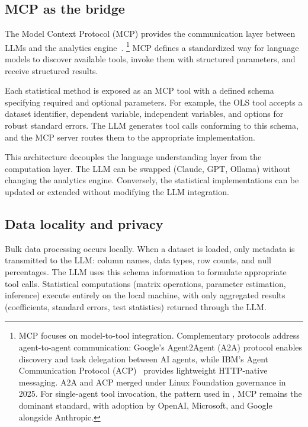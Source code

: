 \subsection{MCP as the bridge}

The Model Context Protocol (MCP) provides the communication layer between
LLMs and the analytics engine~\citep{MCP:2024}.%
\footnote{MCP focuses on model-to-tool integration. Complementary protocols
address agent-to-agent communication: Google's Agent2Agent (A2A) protocol
\citep{A2A:2025} enables discovery and task delegation between AI agents,
while IBM's Agent Communication Protocol (ACP)~\citep{ACP:2025} provides
lightweight HTTP-native messaging. A2A and ACP merged under Linux Foundation
governance in 2025. For single-agent tool invocation, the pattern used in
, MCP remains the dominant standard, with adoption
by OpenAI, Microsoft, and Google alongside Anthropic.}
MCP defines a standardized way for language models to discover available
tools, invoke them with structured parameters, and receive structured results.

Each statistical method is exposed as an MCP tool with a defined schema
specifying required and optional parameters. For example, the OLS tool
accepts a dataset identifier, dependent variable, independent variables,
and options for robust standard errors. The LLM generates tool calls
conforming to this schema, and the MCP server routes them to the
appropriate  implementation.

This architecture decouples the language understanding layer from the
computation layer. The LLM can be swapped (Claude, GPT, Ollama) without
changing the analytics engine. Conversely, the statistical implementations
can be updated or extended without modifying the LLM integration.

\subsection{Data locality and privacy}

Bulk data processing occurs locally.
When a dataset is loaded, only metadata is transmitted to the LLM:
column names, data types, row counts, and null percentages. The LLM
uses this schema information to formulate appropriate tool calls.
Statistical computations (matrix operations, parameter estimation,
inference) execute entirely on the local machine, with only aggregated
results (coefficients, standard errors, test statistics) returned
through the LLM.


